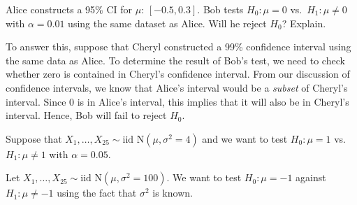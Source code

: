 \documentclass[addpoints,12pt]{exam}
\begin{document}
\begin{questions}
\question Alice constructs a 95\% CI for $\mu$: $[-0.5, 0.3]$. Bob tests $H_0\colon \mu = 0$ vs.\ $H_1\colon \mu\neq 0$ with $\alpha = 0.01$ using the same dataset as Alice. Will he reject $H_0$? Explain.
\begin{solution}
  To answer this, suppose that Cheryl constructed a 99\% confidence interval using the same data as Alice.
  To determine the result of Bob's test, we need to check whether zero is contained in Cheryl's confidence interval.
  From our discussion of confidence intervals, we know that Alice's interval would be a \emph{subset} of Cheryl's interval.
  Since $0$ is in Alice's interval, this implies that it will also be in Cheryl's interval. 
  Hence, Bob will fail to reject $H_0$.
\end{solution}

\question Suppose that $X_1, \dots, X_{25} \sim \text{iid N}(\mu, \sigma^2 = 4)$ and we want to test $H_0\colon \mu = 1$ vs.\ $H_1\colon \mu \neq 1$ with $\alpha = 0.05$.

\question Let $X_1, \dots, X_{25} \sim \mbox{iid N}(\mu, \sigma^2 = 100)$. We want to test $H_0\colon \mu = -1$ against $H_1\colon \mu \neq -1$ using the fact that $\sigma^2$ is known.
\begin{parts}

\end{parts}
\end{questions}
\end{document}
